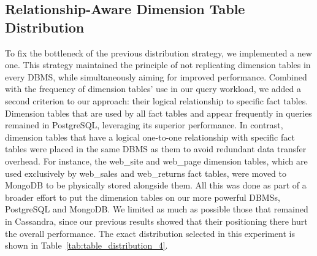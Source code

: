 \documentclass[conference]{IEEEtran}
\begin{document}
\subsection{Relationship-Aware Dimension Table Distribution}\label{subsec:relationship_dimensions}

To fix the bottleneck of the previous distribution strategy, we implemented a new one. This strategy maintained the principle of not replicating dimension tables in every DBMS, while simultaneously aiming for improved performance. Combined with the frequency of dimension tables’ use in our query workload, we added a second criterion to our approach: their logical relationship to specific fact tables. Dimension tables that are used by all fact tables and appear frequently in queries remained in PostgreSQL, leveraging its superior performance. In contrast, dimension tables that have a logical one-to-one relationship with specific fact tables were placed in the same DBMS as them to avoid redundant data transfer overhead. For instance, the web\_site and web\_page dimension tables, which are used exclusively by web\_sales and web\_returns fact tables, were moved to MongoDB to be physically stored alongside them. All this was done as part of a broader effort to put the dimension tables on our more powerful DBMSs, PostgreSQL and MongoDB. We limited as much as possible those that remained in Cassandra, since our previous results showed that their positioning there hurt the overall performance.
The exact distribution selected in this experiment is shown in Table~\ref{tab:table_distribution_4}.
\end{document}
